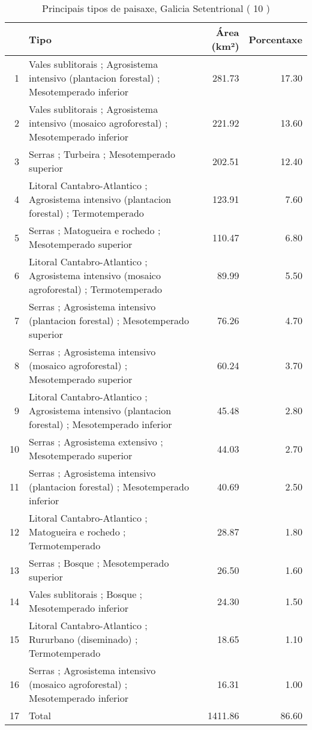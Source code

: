 \begin{table}[p]
\centering
\caption{Principais tipos de paisaxe,  Galicia Setentrional ( 10 )} 
\label{Tipos 10}
\begin{tabular}{rlrr}
  \hline
 & Tipo & Área (km²) & Porcentaxe \\ 
  \hline
1 & Vales sublitorais ; Agrosistema intensivo (plantacion forestal) ; Mesotemperado inferior & 281.73 & 17.30 \\ 
  2 & Vales sublitorais ; Agrosistema intensivo (mosaico agroforestal) ; Mesotemperado inferior & 221.92 & 13.60 \\ 
  3 & Serras ; Turbeira ; Mesotemperado superior & 202.51 & 12.40 \\ 
  4 & Litoral Cantabro-Atlantico ; Agrosistema intensivo (plantacion forestal) ; Termotemperado & 123.91 & 7.60 \\ 
  5 & Serras ; Matogueira e rochedo ; Mesotemperado superior & 110.47 & 6.80 \\ 
  6 & Litoral Cantabro-Atlantico ; Agrosistema intensivo (mosaico agroforestal) ; Termotemperado & 89.99 & 5.50 \\ 
  7 & Serras ; Agrosistema intensivo (plantacion forestal) ; Mesotemperado superior & 76.26 & 4.70 \\ 
  8 & Serras ; Agrosistema intensivo (mosaico agroforestal) ; Mesotemperado superior & 60.24 & 3.70 \\ 
  9 & Litoral Cantabro-Atlantico ; Agrosistema intensivo (plantacion forestal) ; Mesotemperado inferior & 45.48 & 2.80 \\ 
  10 & Serras ; Agrosistema extensivo ; Mesotemperado superior & 44.03 & 2.70 \\ 
  11 & Serras ; Agrosistema intensivo (plantacion forestal) ; Mesotemperado inferior & 40.69 & 2.50 \\ 
  12 & Litoral Cantabro-Atlantico ; Matogueira e rochedo ; Termotemperado & 28.87 & 1.80 \\ 
  13 & Serras ; Bosque ; Mesotemperado superior & 26.50 & 1.60 \\ 
  14 & Vales sublitorais ; Bosque ; Mesotemperado inferior & 24.30 & 1.50 \\ 
  15 & Litoral Cantabro-Atlantico ; Rururbano (diseminado) ; Termotemperado & 18.65 & 1.10 \\ 
  16 & Serras ; Agrosistema intensivo (mosaico agroforestal) ; Mesotemperado inferior & 16.31 & 1.00 \\ 
  17 & Total & 1411.86 & 86.60 \\ 
   \hline
\end{tabular}
\end{table}
